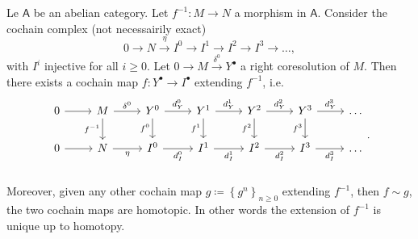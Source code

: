 \begin{thm}[Comparison]
	Le $\mathsf{A}$ be an abelian category.
	Let $f^{-1}\colon M \to N$ a morphism in $\mathsf{A}$.
	Consider the cochain complex (not necessairily exact)
	\begin{equation}
	0 \to N \xrightarrow{\eta} I^0 \to I^1 \to I^2 \to I^3 \to \ldots
	,\end{equation} 
	with $I^i$ injective for all $i \geq 0$.
	Let $0 \to M \xrightarrow{\delta^0} Y^{\bullet}$ a right coresolution of $M$.
	Then there exists a cochain map $f\colon Y^\bullet \to I^\bullet$
	extending $f^{-1}$, i.e.
	\begin{equation}
	\begin{tikzcd}
		0 \arrow[r, "", rightarrow] &
		M \arrow[r, "\delta^0", rightarrow] \arrow[d, "f^{-1}"', rightarrow] &
		Y^0 \arrow[r, "d^0_Y", rightarrow] \arrow[d, "f^0"', rightarrow] &
		Y^1 \arrow[r, "d^1_Y", rightarrow] \arrow[d, "f^1"', rightarrow] &
		Y^2 \arrow[r, "d^2_Y", rightarrow] \arrow[d, "f^2"', rightarrow] &
		Y^3 \arrow[r, "d^3_Y", rightarrow] \arrow[d, "f^3"', rightarrow] &
		\ldots\\
		0 \arrow[r, "", rightarrow] &
		N \arrow[r, "\eta"', rightarrow] &
		I^0 \arrow[r, "d^0_I"', rightarrow] &
		I^1 \arrow[r, "d^1_I"', rightarrow] &
		I^2 \arrow[r, "d^2_I"', rightarrow] &
		I^3 \arrow[r, "d^3_I"', rightarrow] &
		\ldots\\
	\end{tikzcd}
	.\end{equation} 
	Moreover, given any other cochain map $g \coloneqq \left\{ g^n \right\}_{n \geq 0}$ extending
	$f^{-1}$, then $f \sim g$, the two cochain maps are homotopic.
	In other words the extension of $f^{-1}$ is unique up to homotopy.
\end{thm}
